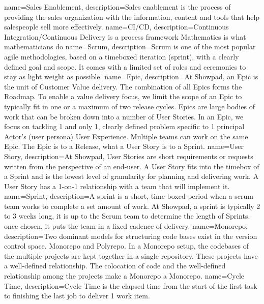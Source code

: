 {
    name=Sales Enablement,
    description={Sales enablement is the process of providing the sales organization with the information, content and tools that help salespeople sell more effectively. }
}
{
    name=CI/CD,
    description={Continuous Integration/Continuous Delivery is a process framework Mathematics is what mathematicians do}
}
{
    name=Scrum,
    description={Scrum is one of the most popular agile methodologies, based on a timeboxed iteration (sprint), with a clearly defined goal and scope. It comes with a limited set of roles and ceremonies to stay as light weight as possible.}
}
{
    name=Epic,
    description={At Showpad, an Epic is the unit of Customer Value delivery. The combination of all Epics forms the Roadmap. To enable a value delivery focus, we limit the scope of an Epic to typically fit in one or a maximum of two release cycles. Epics are large bodies of work that can be broken down into a number of User Stories. In an Epic, we focus on tackling 1 and only 1, clearly defined problem specific to 1 principal Actor’s (user persona) User Experience. Multiple teams can work on the same Epic. The Epic is to a Release, what a User Story is to a Sprint.
    }
}
{
    name=User Story,
    description={At Showpad, User Stories are short requirements or requests written from the perspective of an end-user. A User Story fits into the timebox of a Sprint and is the lowest level of granularity for planning and delivering work. A User Story has a 1-on-1 relationship with a team that will implement it.}
}
{
        name=Sprint,
        description={A sprint is a short, time-boxed period when a scrum team works to complete a set amount of work. At Showpad, a sprint is typically 2 to 3 weeks long, it is up to the Scrum team to determine the length of Sprints. once chosen, it puts the team in a fixed cadence of delivery.}
}
{
    name=Monorepo,
    description={Two dominant models for structuring code bases exist in the version control space. Monorepo and Polyrepo. In a Monorepo setup, the codebases of the multiple projects are kept together in a single repository. These projects have a well-defined relationship. The colocation of code and the well-defined relationship among the projects make a Monorepo a Monorepo.}
}
{
    name=Cycle Time,
    description={Cycle Time is the elapsed time from the start of the first task to finishing the last job to deliver 1 work item.}
}


    